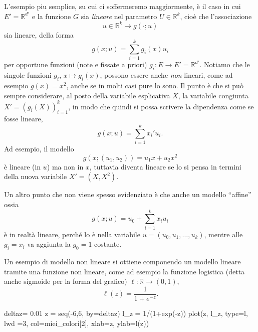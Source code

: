 \documentclass[
  italian,
  letterpaper,
]{book}
\newenvironment{Shaded}{\begin{snugshade}}{\end{snugshade}}
\newcommand{\AttributeTok}[1]{\textcolor[rgb]{0.40,0.45,0.13}{#1}}
\newcommand{\DecValTok}[1]{\textcolor[rgb]{0.68,0.00,0.00}{#1}}
\newcommand{\FloatTok}[1]{\textcolor[rgb]{0.68,0.00,0.00}{#1}}
\newcommand{\FunctionTok}[1]{\textcolor[rgb]{0.28,0.35,0.67}{#1}}
\newcommand{\NormalTok}[1]{\textcolor[rgb]{0.00,0.23,0.31}{#1}}
\newcommand{\OtherTok}[1]{\textcolor[rgb]{0.00,0.23,0.31}{#1}}
\newcommand{\SpecialCharTok}[1]{\textcolor[rgb]{0.37,0.37,0.37}{#1}}
\newcommand{\StringTok}[1]{\textcolor[rgb]{0.13,0.47,0.30}{#1}}
\newcommand{\R}{\mathbb{R}}
\theoremstyle{definition}
\theoremstyle{remark}
\begin{document}
L'esempio piu semplice, su cui ci soffermeremo maggiormente, è il caso
in cui \(E' = \R^{d'}\) e la funzione \(G\) sia \emph{lineare} nel
parametro \(U\in \R^k\), cioè che l'associazione
\[ u \in \R^k \mapsto g( \cdot ; u) \] sia lineare, della forma
\[ g(x; u) = \sum_{i=1}^k g_i(x) u_i\] per opportune funzioni (note e
fissate a priori) \(g_i: E \to E' = \R^{d'}\). Notiamo che le singole
funzioni \(g_i\), \(x \mapsto g_i(x)\), possono essere anche \emph{non}
lineari, come ad esempio \(g(x) = x^2\), anche se in molti casi pure lo
sono. Il punto è che si può sempre considerare, al posto della variabile
esplicativa \(X\), la variabile congiunta \(X' = (g_i(X))_{i=1}^k\), in
modo che quindi si possa scrivere la dipendenza come se fosse lineare,
\[ g(x; u) = \sum_{i=1}^k x_i' u_i.\] Ad esempio, il modello
\[g(x; (u_1, u_2)) = u_1 x+ u_2 x^2\] è lineare (in \(u\)) ma non in
\(x\), tuttavia diventa lineare se lo si pensa in termini della nuova
variabile \(X' = (X, X^2)\).

Un altro punto che non viene spesso evidenziato è che anche un modello
``affine'' ossia \[ g(x; u) = u_0 + \sum_{i=1}^k x_i u_i \] è in realtà
lineare, perché lo è nella variabile \(u = (u_0, u_1, \ldots, u_k)\),
mentre alle \(g_i = x_i\) va aggiunta la \(g_0 = 1\) costante.

Un esempio di modello non lineare si ottiene componendo un modello
lineare tramite una funzione non lineare, come ad esempio la funzione
logistica (detta anche sigmoide per la forma del grafico)
\(\ell: \R \to (0,1)\), \[\ell(z) = \frac{1}{1+e^{-z}}.\]

\begin{Shaded}
\begin{Highlighting}[]
\NormalTok{deltaz}\OtherTok{=} \FloatTok{0.01}
\NormalTok{z }\OtherTok{=} \FunctionTok{seq}\NormalTok{(}\SpecialCharTok{{-}}\DecValTok{6}\NormalTok{,}\DecValTok{6}\NormalTok{, }\AttributeTok{by=}\NormalTok{deltaz)}
\NormalTok{l\_z }\OtherTok{=} \DecValTok{1}\SpecialCharTok{/}\NormalTok{(}\DecValTok{1}\SpecialCharTok{+}\FunctionTok{exp}\NormalTok{(}\SpecialCharTok{{-}}\NormalTok{z))}
\FunctionTok{plot}\NormalTok{(z, l\_z, }\AttributeTok{type=}\StringTok{\textquotesingle{}l\textquotesingle{}}\NormalTok{, }\AttributeTok{lwd =}\DecValTok{3}\NormalTok{, }\AttributeTok{col=}\NormalTok{miei\_colori[}\DecValTok{2}\NormalTok{], }\AttributeTok{xlab=}\StringTok{\textquotesingle{}z\textquotesingle{}}\NormalTok{, }\AttributeTok{ylab=}\StringTok{\textquotesingle{}l(z)\textquotesingle{}}\NormalTok{)}
\end{Highlighting}
\end{Shaded}
\end{document}
